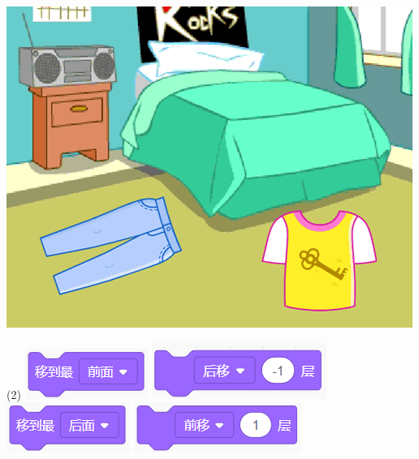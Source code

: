 \documentclass[10pt, a4paper]{article}
\begin{document}
\begin{enumerate}
        \begin{minipage}{.21\textwidth}
            \centering
            \includegraphics[width=.7\textwidth]{figure/22.png}
        \end{minipage}
        \begin{minipage}{.7\textwidth}
            \begin{tasks}(2)
                \task \includegraphics[width=.14\textwidth]{figure/22a.png}
                \task \includegraphics[width=.18\textwidth]{figure/22b.png}
                \task \includegraphics[width=.14\textwidth]{figure/22c.png}
                \task \includegraphics[width=.18\textwidth]{figure/22d.png}
            \end{tasks}
        \end{minipage}


\end{enumerate}
\end{document}
